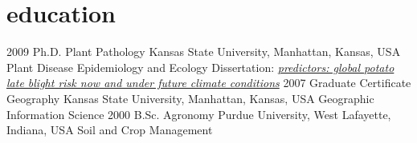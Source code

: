 \section*{education}

\begin{entrylist}
  \entry
    {2009}
    {Ph.D. {\normalfont Plant Pathology}}
    {Kansas State University, Manhattan, Kansas, USA}
    {Plant Disease Epidemiology and Ecology}
  \entry
    {}
    {Dissertation: }
    {}
      {\emph{\href{https://krex.k-state.edu/dspace/handle/2097/2341?show=full}{predictors: global potato late blight risk now and under future climate conditions}}}
 \entry
    {2007}
    {Graduate Certificate {\normalfont Geography}}
    {Kansas State University, Manhattan, Kansas, USA}
    {Geographic Information Science}
  \entry
    {2000}
    {B.Sc. {\normalfont Agronomy}}
    {Purdue University, West Lafayette, Indiana, USA}
    {Soil and Crop Management}
\end{entrylist}
